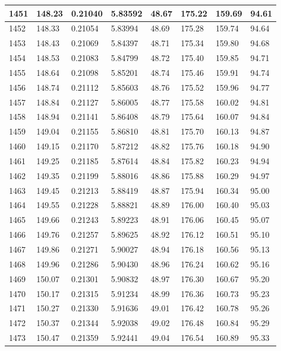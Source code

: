 \documentclass[12pt,a4paper,twoside]{article}
\begin{document}
\begin{center}
\begin{longtable}{l l l l | l l l l}
1451 & 148.23 & 0.21040 & 5.83592 & 48.67 & 175.22 & 159.69 & 94.61 \\ \hline
1452 & 148.33 & 0.21054 & 5.83994 & 48.69 & 175.28 & 159.74 & 94.64 \\ \hline
1453 & 148.43 & 0.21069 & 5.84397 & 48.71 & 175.34 & 159.80 & 94.68 \\ \hline
1454 & 148.53 & 0.21083 & 5.84799 & 48.72 & 175.40 & 159.85 & 94.71 \\ \hline
1455 & 148.64 & 0.21098 & 5.85201 & 48.74 & 175.46 & 159.91 & 94.74 \\ \hline
1456 & 148.74 & 0.21112 & 5.85603 & 48.76 & 175.52 & 159.96 & 94.77 \\ \hline
1457 & 148.84 & 0.21127 & 5.86005 & 48.77 & 175.58 & 160.02 & 94.81 \\ \hline
1458 & 148.94 & 0.21141 & 5.86408 & 48.79 & 175.64 & 160.07 & 94.84 \\ \hline
1459 & 149.04 & 0.21155 & 5.86810 & 48.81 & 175.70 & 160.13 & 94.87 \\ \hline
1460 & 149.15 & 0.21170 & 5.87212 & 48.82 & 175.76 & 160.18 & 94.90 \\ \hline
1461 & 149.25 & 0.21185 & 5.87614 & 48.84 & 175.82 & 160.23 & 94.94 \\ \hline
1462 & 149.35 & 0.21199 & 5.88016 & 48.86 & 175.88 & 160.29 & 94.97 \\ \hline
1463 & 149.45 & 0.21213 & 5.88419 & 48.87 & 175.94 & 160.34 & 95.00 \\ \hline
1464 & 149.55 & 0.21228 & 5.88821 & 48.89 & 176.00 & 160.40 & 95.03 \\ \hline
1465 & 149.66 & 0.21243 & 5.89223 & 48.91 & 176.06 & 160.45 & 95.07 \\ \hline
1466 & 149.76 & 0.21257 & 5.89625 & 48.92 & 176.12 & 160.51 & 95.10 \\ \hline
1467 & 149.86 & 0.21271 & 5.90027 & 48.94 & 176.18 & 160.56 & 95.13 \\ \hline
1468 & 149.96 & 0.21286 & 5.90430 & 48.96 & 176.24 & 160.62 & 95.16 \\ \hline
1469 & 150.07 & 0.21301 & 5.90832 & 48.97 & 176.30 & 160.67 & 95.20 \\ \hline
1470 & 150.17 & 0.21315 & 5.91234 & 48.99 & 176.36 & 160.73 & 95.23 \\ \hline
1471 & 150.27 & 0.21330 & 5.91636 & 49.01 & 176.42 & 160.78 & 95.26 \\ \hline
1472 & 150.37 & 0.21344 & 5.92038 & 49.02 & 176.48 & 160.84 & 95.29 \\ \hline
1473 & 150.47 & 0.21359 & 5.92441 & 49.04 & 176.54 & 160.89 & 95.33 \\ \hline

\end{longtable}
\end{center}
\end{document}
